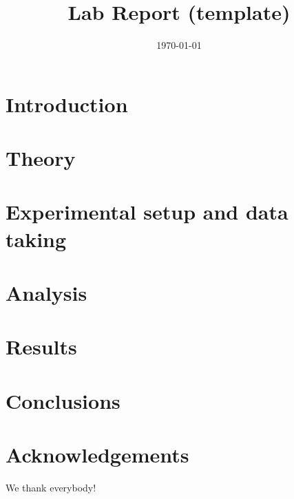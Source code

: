 \documentclass{atlasnote}
\title{Lab Report (template)}
\date{\today}
\begin{document}



\tableofcontents

\newpage

\section{Introduction}
\label{sec:intro}


\section{Theory}
\label{sec:theory}


\section{Experimental setup and data taking}
\label{sec:daq}


\section{Analysis}
\label{sec:analysis}


\section{Results}
\label{sec:results}


\section{Conclusions}
\label{sec:conclusion}


\section*{Acknowledgements}
We thank everybody!






\end{document}

